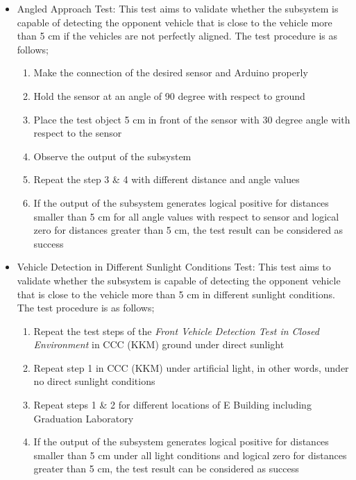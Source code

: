 \documentclass[a4paper,12pt]{article}
\begin{document}
\begin{itemize}
		\item {Angled Approach Test:}
			This test aims to validate whether the subsystem is capable of detecting the opponent vehicle that is close to the vehicle more than 5 cm if the vehicles are not perfectly aligned. The test procedure is as follows;
			\begin{enumerate}
				\item Make the connection of the desired sensor and Arduino properly \vspace{-0.2cm}
				\item Hold the sensor at an angle of 90 degree with respect to ground \vspace{-0.2cm}
				\item Place the test object 5 cm in front of the sensor with 30 degree angle with respect to the sensor \vspace{-0.2cm}
				\item Observe the output of the subsystem \vspace{-0.2cm}
				\item Repeat the step 3 \& 4 with different distance and angle values \vspace{-0.2cm}
				\item If the output of the subsystem generates logical positive for distances smaller than 5 cm for all angle values with respect to sensor and logical zero for distances greater than 5 cm, the test result can be considered as success \vspace{-0.2cm}
			\end{enumerate}
		
		\item Vehicle Detection in Different Sunlight Conditions Test:
			This test aims to validate whether the subsystem is capable of detecting the opponent vehicle that is close to the vehicle more than 5 cm in different sunlight conditions. The test procedure is as follows; 		
			\begin{enumerate}
				\item Repeat the test steps of the \textit{Front Vehicle Detection Test in Closed Environment} in CCC (KKM) ground under direct sunlight \vspace{-0.2cm}
				\item Repeat step 1 in CCC (KKM) under artificial light, in other words, under no direct sunlight conditions \vspace{-0.2cm}
				\item Repeat steps 1 \& 2 for different locations of E Building including Graduation Laboratory \vspace{-0.2cm}
				\item If the output of the subsystem generates logical positive for distances smaller than 5 cm under all light conditions and logical zero for distances greater than 5 cm, the test result can be considered as success \vspace{-0.2cm}
			\end{enumerate}
			
		\end{itemize}
	
\end{document}
